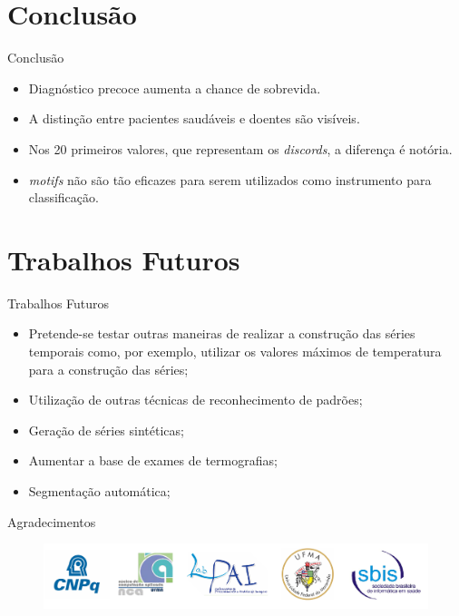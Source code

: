 \documentclass[apesctratio=169]{beamer}
\begin{document}
	\section{Conclusão}
	\begin{frame}{Conclusão}
	
	    \begin{block}
	    
	        \begin{itemize}
	            \item Diagnóstico precoce aumenta a chance de sobrevida.
	            \item  A distinção entre pacientes saudáveis e doentes são visíveis.
	            \item  Nos 20 primeiros valores, que representam os \textit{discords}, a diferença é notória.
	            \item  \textit{motifs} não são tão eficazes para serem utilizados como instrumento para classificação.
	        \end{itemize}
	    \end{block}
	\end{frame}
	
	\section{Trabalhos Futuros}
	
	\begin{frame}{Trabalhos Futuros}
	    \begin{itemize}
	        \item Pretende-se testar outras maneiras de realizar a construção das séries temporais como, por exemplo, utilizar os valores máximos de temperatura para a construção das séries;
	        \item Utilização de outras técnicas de reconhecimento de padrões;
	        \item Geração de séries sintéticas;
	        \item Aumentar a base de exames de termografias;
	        \item Segmentação automática;
	    \end{itemize}
	    
	\end{frame}
	
	\begin{frame}{Agradecimentos}
	    \begin{figure}[htb]
			     \includegraphics[scale=0.35]{ak.PNG}
		\end{figure}
	\end{frame}		
	
\end{document}
